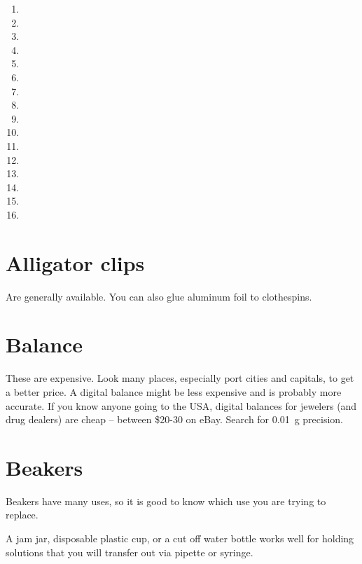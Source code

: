 \begin{enumerate}
\item {}
\item {}
\item {}
\item {}
\item {}
\item {}
\item {}
\item {}
\item {}
\item {}
\item {}
\item {}
\item {}
\item {}
\item {}
\item {}
\end{enumerate}

\section{Alligator clips}
\label{sec:alligator-clips}
Are generally available. 
You can also glue aluminum foil to clothespins.

\section{Balance}
\label{sec:balance}
These are expensive. 
Look many places, 
especially port cities and capitals, 
to get a better price. 
A digital balance might be less expensive 
and is probably more accurate. 
If you know anyone going to the USA, 
digital balances for jewelers (and drug dealers) are cheap -- %
between \$20-30 on eBay. 
Search for 0.01~g precision.

\section{Beakers}
\label{sec:beakers}
Beakers have many uses, 
so it is good to know which use you are trying to replace.

A jam jar, 
disposable plastic cup, 
or a cut off water bottle works well for holding solutions 
that you will transfer out via pipette or syringe.

